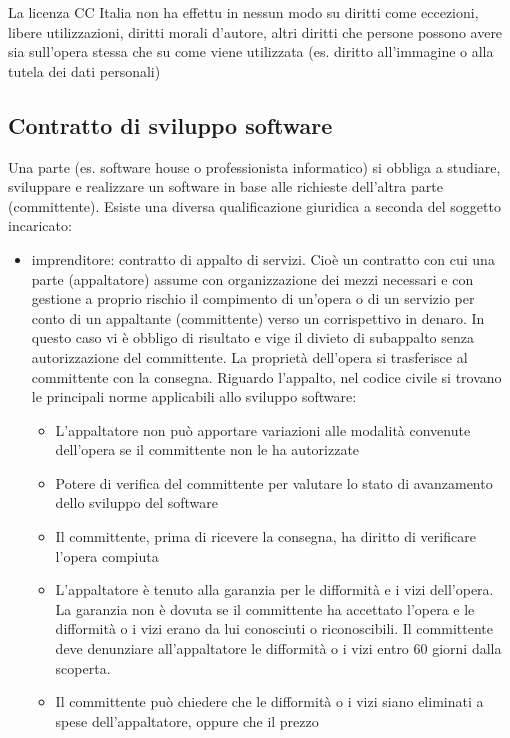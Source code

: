 La licenza CC Italia non ha effettu in nessun modo su diritti come eccezioni,
libere utilizzazioni, diritti morali d'autore, altri diritti che persone
possono avere sia sull'opera stessa
che su come viene utilizzata (es. diritto all'immagine o alla tutela dei dati personali)

\subsection{Contratto di sviluppo software}
Una parte (es. software house o professionista informatico) si obbliga a studiare, sviluppare e realizzare un software in base alle richieste dell'altra parte (committente).\newline
Esiste una diversa qualificazione giuridica a seconda del soggetto incaricato:
\begin{itemize}
    \item imprenditore: contratto di appalto di servizi. Cioè un contratto con cui una parte (appaltatore) assume con organizzazione dei mezzi
    necessari e con gestione a proprio rischio il compimento di un'opera o di un servizio per conto di un appaltante (committente) verso un corrispettivo
    in denaro. In questo caso vi è obbligo di risultato e vige il divieto di subappalto senza autorizzazione del committente.\newline
    La proprietà dell'opera si trasferisce al committente con la consegna.\newline
    Riguardo l'appalto, nel codice civile si trovano le principali norme applicabili allo sviluppo software:
    \begin{itemize}
        \item L'appaltatore non può apportare variazioni alle modalità convenute dell'opera se il committente non le ha autorizzate
        \item Potere di verifica del committente per valutare lo stato di avanzamento dello sviluppo del software
        \item Il committente, prima di ricevere la consegna, ha diritto di verificare l'opera compiuta
        \item L'appaltatore è tenuto alla garanzia per le difformità e i vizi dell'opera. La garanzia non è dovuta se il committente ha
        accettato l'opera e le difformità o i vizi erano da lui conosciuti o riconoscibili. Il committente deve denunziare all'appaltatore le
        difformità o i vizi entro 60 giorni dalla scoperta.
        \item Il committente può chiedere che le difformità o i vizi siano eliminati a spese dell'appaltatore, oppure che il prezzo

\end{itemize}
\end{itemize}
